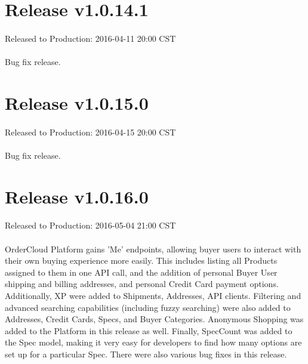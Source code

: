 \documentclass{memoir}%
\begin{document}
%
\section*{Release v1.0.14.1}%
\paragraph*{}%
Released to Production: 2016{-}04{-}11 20:00 CST

%
\paragraph*{}%
Bug fix release.

%
\section*{Release v1.0.15.0}%
\paragraph*{}%
Released to Production: 2016{-}04{-}15 20:00 CST

%
\paragraph*{}%
Bug fix release.

%
\section*{Release v1.0.16.0}%
\paragraph*{}%
Released to Production: 2016{-}05{-}04 21:00 CST

%
\paragraph*{}%
OrderCloud Platform gains 'Me' endpoints, allowing buyer users to interact with their own buying experience more easily. This includes listing all Products assigned to them in one API call, and the addition of personal Buyer User shipping and billing addresses, and personal Credit Card payment options. Additionally, XP were added to Shipments, Addresses, API clients. Filtering and advanced searching capabilities (including fuzzy searching) were also added to Addresses, Credit Cards, Specs, and Buyer Categories. Anonymous Shopping was added to the Platform in this release as well. Finally, SpecCount was added to the Spec model, making it very easy for developers to find how many options are set up for a particular Spec. There were also various bug fixes in this release.
\end{document}
